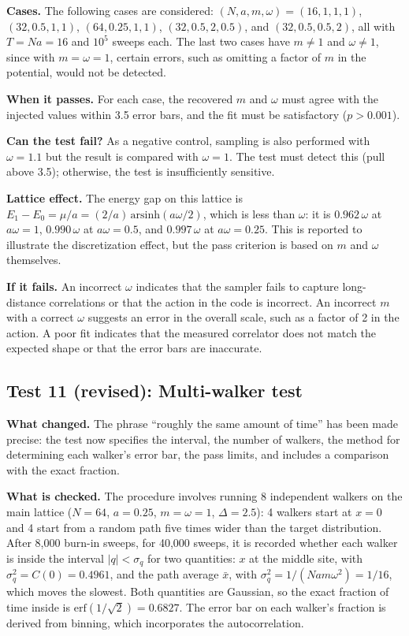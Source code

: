 \documentclass[11pt]{article}
\begin{document}
\textbf{Cases.} The following cases are considered: $(N, a, m, \omega) = (16, 1, 1, 1)$, $(32, 0.5, 1, 1)$, $(64, 0.25, 1, 1)$, $(32, 0.5, 2, 0.5)$, and $(32, 0.5, 0.5, 2)$, all with $T = Na = 16$ and $10^5$ sweeps each. The last two cases have $m \ne 1$ and $\omega \ne 1$, since with $m = \omega = 1$, certain errors, such as omitting a factor of $m$ in the potential, would not be detected.

\textbf{When it passes.} For each case, the recovered $m$ and $\omega$ must agree with the injected values within 3.5 error bars, and the fit must be satisfactory ($p > 0.001$).

\textbf{Can the test fail?} As a negative control, sampling is also performed with $\omega = 1.1$ but the result is compared with $\omega = 1$. The test must detect this (pull above 3.5); otherwise, the test is insufficiently sensitive.

\textbf{Lattice effect.} The energy gap on this lattice is $E_1 - E_0 = \mu/a = (2/a)\,\mathrm{arsinh}(a\omega/2)$, which is less than $\omega$: it is $0.962\,\omega$ at $a\omega = 1$, $0.990\,\omega$ at $a\omega = 0.5$, and $0.997\,\omega$ at $a\omega = 0.25$. This is reported to illustrate the discretization effect, but the pass criterion is based on $m$ and $\omega$ themselves.

\textbf{If it fails.} An incorrect $\omega$ indicates that the sampler fails to capture long-distance correlations or that the action in the code is incorrect. An incorrect $m$ with a correct $\omega$ suggests an error in the overall scale, such as a factor of 2 in the action. A poor fit indicates that the measured correlator does not match the expected shape or that the error bars are inaccurate.

\subsection*{Test 11 (revised): Multi-walker test}
\textbf{What changed.} The phrase ``roughly the same amount of time'' has been made precise: the test now specifies the interval, the number of walkers, the method for determining each walker's error bar, the pass limits, and includes a comparison with the exact fraction.

\textbf{What is checked.} The procedure involves running 8 independent walkers on the main lattice ($N = 64$, $a = 0.25$, $m = \omega = 1$, $\Delta = 2.5$): 4 walkers start at $x = 0$ and 4 start from a random path five times wider than the target distribution. After 8,000 burn-in sweeps, for 40,000 sweeps, it is recorded whether each walker is inside the interval $|q| < \sigma_q$ for two quantities: $x$ at the middle site, with $\sigma_q^2 = C(0) = 0.4961$, and the path average $\bar x$, with $\sigma_q^2 = 1/(Nam\omega^2) = 1/16$, which moves the slowest. Both quantities are Gaussian, so the exact fraction of time inside is $\mathrm{erf}(1/\sqrt2) = 0.6827$. The error bar on each walker's fraction is derived from binning, which incorporates the autocorrelation.
\end{document}
